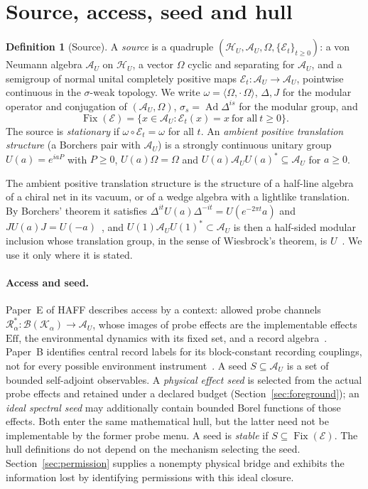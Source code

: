 \documentclass[12pt]{article}
\theoremstyle{definition}
\newtheorem{definition}[theorem]{Definition}
\theoremstyle{remark}
\newcommand{\Fix}{\operatorname{Fix}}
\newcommand{\AU}{\mathcal A_U}
\newcommand{\Ad}{\operatorname{Ad}}
\begin{document}
\section{Source, access, seed and hull}\label{sec:objects}

\begin{definition}[Source]\label{def:source}
A \emph{source} is a quadruple \((\mathcal H_U,\AU,\Omega,\{\mathcal E_t\}_{t\ge0})\):
a von Neumann algebra \(\AU\) on \(\mathcal H_U\), a vector \(\Omega\) cyclic and
separating for \(\AU\), and a semigroup of normal unital completely positive maps
\(\mathcal E_t:\AU\to\AU\), pointwise continuous in the \(\sigma\)-weak topology. We write
\(\omega=\langle\Omega,\cdot\,\Omega\rangle\), \(\Delta,J\) for the modular operator
and conjugation of \((\AU,\Omega)\), \(\sigma_s=\Ad\Delta^{is}\) for the modular group,
and
\[
\Fix(\mathcal E)=\{x\in\AU:\mathcal E_t(x)=x\ \text{for all}\ t\ge0\}.
\]
The source is \emph{stationary} if \(\omega\circ\mathcal E_t=\omega\) for all \(t\).
An \emph{ambient positive translation structure} (a Borchers pair with $\AU$) is a strongly continuous unitary group \(U(a)=e^{iaP}\) with
\(P\ge0\), \(U(a)\Omega=\Omega\) and \(U(a)\AU U(a)^*\subseteq\AU\) for \(a\ge0\).
\end{definition}

The ambient positive translation structure is the structure of a half-line algebra of a chiral net in its vacuum,
or of a wedge algebra with a lightlike translation. By Borchers' theorem it satisfies
\(\Delta^{it}U(a)\Delta^{-it}=U(e^{-2\pi t}a)\) and \(JU(a)J=U(-a)\)~\cite{Borchers1992},
and \(U(1)\AU U(1)^*\subset\AU\) is then a half-sided modular inclusion whose
translation group, in the sense of Wiesbrock's theorem, is \(U\)~\cite{Wiesbrock1993,AZ}. We use it only where it is stated.

\paragraph{Access and seed.} Paper~E of HAFF describes access by a context: allowed
probe channels \(\mathcal R_\alpha^*:\mathcal B(\mathcal K_\alpha)\to\AU\), whose images
of probe effects are the implementable effects \(\mathrm{Eff}\), the environmental
dynamics with its fixed set, and a record algebra~\cite{HAFFE}. Paper~B identifies central record labels for its block-constant recording
couplings, not for every possible environment instrument~\cite{HAFFB}.
A seed \(S\subseteq\AU\) is a set of bounded self-adjoint observables.
A \emph{physical effect seed} is selected from the actual probe effects and
retained under a declared budget (Section~\ref{sec:foreground}); an
\emph{ideal spectral seed} may additionally contain bounded Borel functions of
those effects. Both enter the same mathematical hull, but the latter need not
be implementable by the former probe menu. A seed is \emph{stable} if
\(S\subseteq\Fix(\mathcal E)\). The hull definitions do not depend on the
mechanism selecting the seed. Section~\ref{sec:permission} supplies a nonempty
physical bridge and exhibits the information lost by identifying permissions
with this ideal closure.
\end{document}
